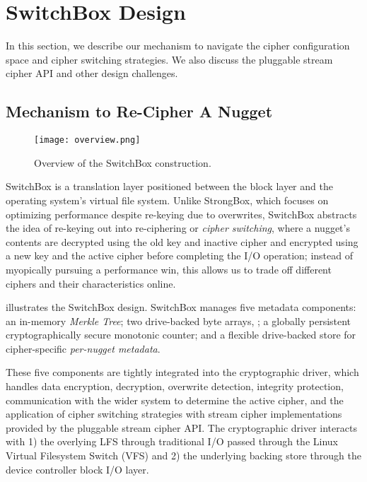 \section{SwitchBox Design}\label{sec:design}


In this section, we describe our mechanism to navigate the cipher
configuration space and cipher switching strategies. We also discuss the
pluggable stream cipher API and other design challenges.

\subsection{Mechanism to Re-Cipher A Nugget}

\begin{figure}[t]
   \centering
   \texttt{[image: overview.png]}
   \caption{Overview of the SwitchBox construction.}\label{fig:overview}
\end{figure}

SwitchBox is a translation layer positioned between the block layer and the
operating system's virtual file system. Unlike StrongBox, which focuses on
optimizing performance despite re-keying due to overwrites, SwitchBox abstracts
the idea of re-keying out into re-ciphering or \emph{cipher switching}, where a
nugget's contents are decrypted using the old key and inactive cipher and
encrypted using a new key and the active cipher before completing the I/O
operation; instead of myopically pursuing a performance win, this allows us to
trade off different ciphers and their characteristics online.

 illustrates the SwitchBox design. SwitchBox manages five
metadata components: an in-memory \emph{Merkle Tree}; two drive-backed byte
arrays, ; a
globally persistent cryptographically secure monotonic counter; and a flexible
drive-backed store for cipher-specific \emph{per-nugget metadata}.

These five components are tightly integrated into the cryptographic driver,
which handles data encryption, decryption, overwrite detection, integrity
protection, communication with the wider system to determine the active cipher,
and the application of cipher switching strategies with stream cipher
implementations provided by the pluggable stream cipher API. The cryptographic
driver interacts with 1) the overlying LFS through traditional I/O passed
through the Linux Virtual Filesystem Switch (VFS) and 2) the underlying
backing store through the device controller block I/O layer.

